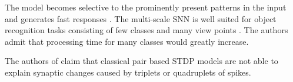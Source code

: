 %
The model becomes selective to the prominently present patterns in the input and generates fast responses \cite{STDP_vis_feat}.
The multi-scale \ac{SNN} is well suited for object recognition tasks consisting of few classes and many view points \cite{multi_scale_STDP}.
The authors admit that processing time for many classes would greatly increase.

The authors of \cite{STDP_triplet} claim that classical pair based \ac{STDP} models 
are not able to explain synaptic changes caused by triplets or quadruplets of spikes.